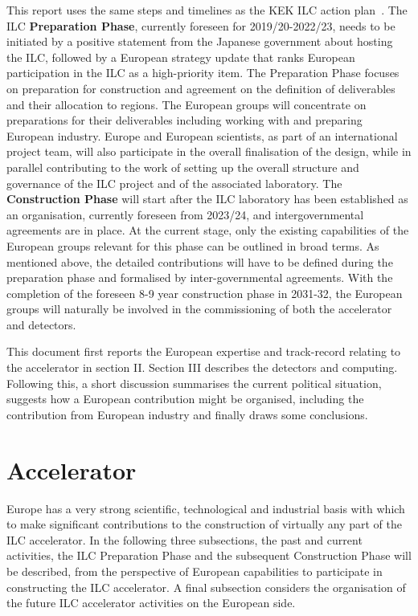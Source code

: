 \documentclass[%
 reprint,
 floatfix,
 amsmath,amssymb,
 aps,
]{revtex4-1}
\begin{document}
This report uses the same steps and timelines as the KEK ILC action plan~\cite{kekactionplan}. The ILC \textbf{Preparation Phase}, currently foreseen for 2019/20-2022/23, needs to be initiated by a positive statement from the Japanese government about hosting the ILC, followed by a European strategy update that ranks European participation in the ILC as a high-priority item. The Preparation Phase focuses on preparation for construction and agreement on the definition of deliverables and their allocation to regions. The European groups will concentrate on preparations for their deliverables including working with and preparing European industry. Europe and European scientists, as part of an international project team, will also participate in the overall finalisation of the design, while in parallel contributing to the work of setting up the overall structure and governance of the ILC project and of the associated laboratory.
The \textbf{Construction Phase} will start after the ILC laboratory has been established as an organisation, currently foreseen from 2023/24, and intergovernmental agreements are in place. At the current stage, only the existing capabilities of the European groups relevant for this phase can be outlined in broad terms. As mentioned above, the detailed contributions will have to be defined during the preparation phase and formalised by inter-governmental agreements.  With the completion of the foreseen 8-9 year construction phase in 2031-32, the European groups will naturally be involved in the commissioning of both the accelerator and detectors.

This document first reports the European expertise and track-record relating to the accelerator in section II. Section III describes the detectors and computing. Following this, a short discussion summarises the current political situation, suggests how a
European contribution might be organised, including the contribution from European industry and finally draws some conclusions.


\section{\label{sec:acc}Accelerator}
Europe has a very strong scientific, technological and industrial basis with which to make significant contributions to the construction of virtually 
any part of the ILC accelerator. In the following three subsections, the past and current activities, the ILC Preparation Phase and the subsequent Construction Phase will be described, from the perspective of European capabilities to participate in constructing the ILC accelerator. 
A final subsection considers the organisation of the future ILC accelerator activities on the European side. 
\end{document}
